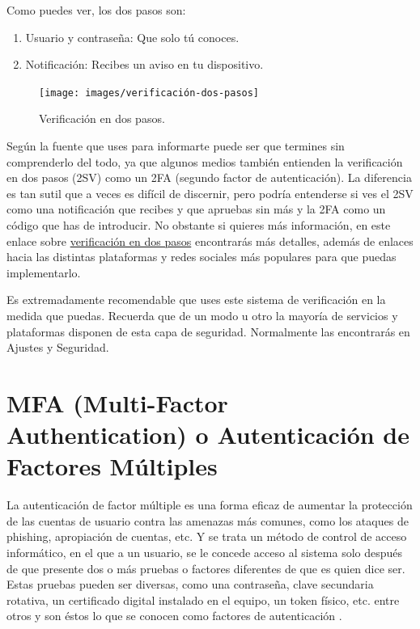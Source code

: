 \documentclass[
  spanish,
  a4paper,
  openany]{book}
\providecommand{\tightlist}{%
  \setlength{\itemsep}{0pt}\setlength{\parskip}{0pt}}
\begin{document}
Como puedes ver, los dos pasos son:

\begin{enumerate}
\def\labelenumi{\arabic{enumi}.}
\tightlist
\item
  Usuario y contraseña: Que solo tú conoces.
\item
  Notificación: Recibes un aviso en tu dispositivo.
\end{enumerate}

\begin{figure}

{\centering \texttt{[image: images/verificación-dos-pasos]} 

}

\caption{Verificación en dos pasos.}\label{fig:unnamed-chunk-13}
\end{figure}

Según la fuente que uses para informarte puede ser que termines sin comprenderlo del todo, ya que algunos medios también entienden la verificación en dos pasos (2SV) como un 2FA (segundo factor de autenticación). La diferencia es tan sutil que a veces es difícil de discernir, pero podría entenderse si ves el 2SV como una notificación que recibes y que apruebas sin más y la 2FA como un código que has de introducir. No obstante si quieres más información, en este enlace sobre \href{https://www.osi.es/es/actualidad/blog/2017/01/17/verificacion-en-dos-pasos-que-es-y-como-me-puede-ayudar}{verificación en dos pasos} encontrarás más detalles, además de enlaces hacia las distintas plataformas y redes sociales más populares para que puedas implementarlo.

Es extremadamente recomendable que uses este sistema de verificación en la medida que puedas. Recuerda que de un modo u otro la mayoría de servicios y plataformas disponen de esta capa de seguridad. Normalmente las encontrarás en Ajustes y Seguridad.

\hypertarget{mfa-multi-factor-authentication-o-autenticaciuxf3n-de-factores-muxfaltiples}{%
\section{MFA (Multi-Factor Authentication) o Autenticación de Factores Múltiples}\label{mfa-multi-factor-authentication-o-autenticaciuxf3n-de-factores-muxfaltiples}}

La autenticación de factor múltiple es una forma eficaz de aumentar la protección de las cuentas de usuario contra las amenazas más comunes, como los ataques de phishing, apropiación de cuentas, etc. Y se trata un método de control de acceso informático, en el que a un usuario, se le concede acceso al sistema solo después de que presente dos o más pruebas o factores diferentes de que es quien dice ser. Estas pruebas pueden ser diversas, como una contraseña, clave secundaria rotativa, un certificado digital instalado en el equipo, un token físico, etc. entre otros y son éstos lo que se conocen como factores de autenticación \citep{WIKI-multiple-factor}.
\end{document}

